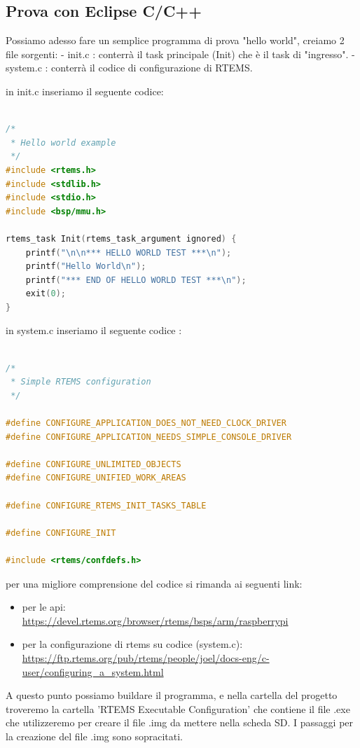 \documentclass[10pt, a4paper]{article}
\begin{document}
\begin{flushleft}
\newpage
\section{Prova con Eclipse C/C++}

Possiamo adesso fare un semplice programma di prova "hello world",
creiamo 2 file sorgenti:
- init.c : conterrà il task principale (Init) che è il task di "ingresso".
- system.c : conterrà il codice di configurazione di RTEMS.

in init.c inseriamo il seguente codice:
\begin{lstlisting}[language=c] 

/*
 * Hello world example
 */
#include <rtems.h>
#include <stdlib.h>
#include <stdio.h>
#include <bsp/mmu.h>

rtems_task Init(rtems_task_argument ignored) {
	printf("\n\n*** HELLO WORLD TEST ***\n");
	printf("Hello World\n");
	printf("*** END OF HELLO WORLD TEST ***\n");
	exit(0);
}


\end{lstlisting}
in system.c inseriamo il seguente codice :

\begin{lstlisting}[language=c] 

/*
 * Simple RTEMS configuration
 */

#define CONFIGURE_APPLICATION_DOES_NOT_NEED_CLOCK_DRIVER
#define CONFIGURE_APPLICATION_NEEDS_SIMPLE_CONSOLE_DRIVER

#define CONFIGURE_UNLIMITED_OBJECTS
#define CONFIGURE_UNIFIED_WORK_AREAS

#define CONFIGURE_RTEMS_INIT_TASKS_TABLE

#define CONFIGURE_INIT

#include <rtems/confdefs.h>

\end{lstlisting}

per una migliore comprensione del codice si rimanda ai seguenti link:
\begin{itemize}
\item per le api: \\ \url{https://devel.rtems.org/browser/rtems/bsps/arm/raspberrypi}
\item per la configurazione di rtems su codice (system.c):\\  \url{https://ftp.rtems.org/pub/rtems/people/joel/docs-eng/c-user/configuring_a_system.html}
\end{itemize}

A questo punto possiamo buildare il programma, e nella cartella del progetto troveremo la cartella 'RTEMS Executable Configuration' che contiene il file .exe che utilizzeremo per creare il file .img da mettere nella scheda SD.
I passaggi per la creazione del file .img sono sopracitati.


\end{flushleft}
\end{document}
